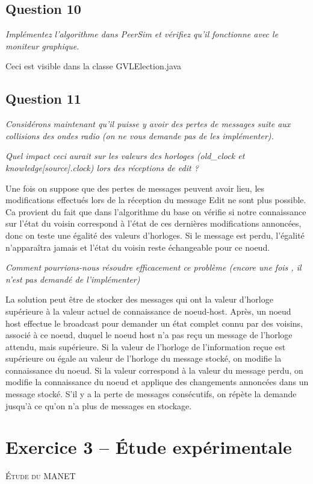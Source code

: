 \documentclass[11pt,a4paper,sans]{report}
\begin{document}
	\section{Question 10}
	\textit{Implémentez l’algorithme dans PeerSim et vérifiez qu’il fonctionne avec le moniteur graphique.}

	Ceci est visible dans la classe GVLElection.java


	\section{Question 11}
	\textit{Considérons maintenant qu’il puisse y avoir des pertes de messages suite aux collisions des ondes radio (on ne vous demande pas de les implémenter).}

	\textit{Quel impact ceci aurait sur les valeurs des horloges (old\_clock et knowledge[source].clock) lors des réceptions de edit ?}
	\par Une fois on suppose que des pertes de messages peuvent avoir lieu, les modifications effectués lors de la réception du message Edit ne sont plus possible. Ca provient du fait que dans l’algorithme du base on vérifie si notre connaissance sur l'état du voisin correspond à l'état de ces dernières modifications annoncées, donc on teste une égalité des valeurs d’horloges. Si le message est perdu, l'égalité n'apparaîtra jamais et l'état du voisin reste échangeable pour ce noeud.


	\textit{Comment pourrions-nous résoudre efficacement ce problème (encore une fois , il n’est pas demandé de l’implémenter)}
	\par La solution peut être de stocker des messages qui ont la valeur d’horloge supérieure à la valeur actuel de connaissance de noeud-host. Après, un noeud host effectue le broadcast pour demander un état complet connu par des voisins, associé à ce noeud, duquel le noeud host n’a pas reçu un message de l’horloge attendu, mais supérieure. Si la valeur de l’horloge de l’information reçue est supérieure ou égale au valeur de l’horloge du message stocké, on modifie la connaissance du noeud. Si la valeur correspond à la valeur du message perdu, on modifie la connaissance du noeud et applique des changements annoncées dans un message stocké. S’il y a la perte de messages consécutifs, on répète la demande jusqu'à ce qu’on n’a plus de messages en stockage.

	\newpage
	\chapter{Exercice 3 – Étude expérimentale}
	\begin{center}
		\textsc{\large Étude du MANET}
	\end{center}
\end{document}

